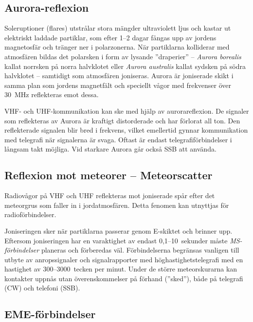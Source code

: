 \subsection{Aurora-reflexion}

Soleruptioner (flares) utstrålar stora mängder ultraviolett ljus och kastar ut
elektriskt laddade partiklar, som efter 1--2 dagar fångas upp av jordens
magnetosfär och tränger ner i polarzonerna.
När partiklarna kolliderar med atmosfären bildas det polarsken i form av lysande
''draperier'' -- \emph{Aurora borealis} kallat norrsken på norra halvklotet
eller \emph{Aurora australis} kallat sydsken på södra halvklotet -- samtidigt
som atmosfären joniseras.
Aurora är joniserade skikt i samma plan som jordens magnetfält och speciellt
vågor med frekvenser över 30~MHz reflekteras emot dessa.

VHF- och UHF-kommunikation kan ske med hjälp av aurorareflexion.
De signaler som reflekteras av Aurora är kraftigt distorderade och har förlorat
all ton.
Den reflekterade signalen blir bred i frekvens, vilket emellertid gynnar
kommunikation med telegrafi när signalerna är svaga.
Oftast är endast telegrafiförbindelser i långsam takt möjliga.
Vid starkare Aurora går också SSB att använda.

\subsection{Reflexion mot meteorer -- Meteorscatter}

Radiovågor på VHF och UHF reflekteras mot joniserade spår efter det
meteorgrus som faller in i jordatmosfären.
Detta fenomen kan utnyttjas för radioförbindelser.

Joniseringen sker när partiklarna passerar genom E-skiktet och brinner upp.
Eftersom joniseringen har en varaktighet av endast 0,1--10~sekunder måste
\emph{MS-förbindelser} planeras och förberedas väl.
Förbindelserna begränsas vanligen till utbyte av anropssignaler och
signalrapporter med höghastighetstelegrafi med en hastighet av
300--3000~tecken per minut.
Under de större meteorskurarna kan kontakter uppnås utan överenskommelser på
förhand (''sked''), både på telegrafi (CW) och telefoni (SSB).

\subsection{EME-förbindelser}

